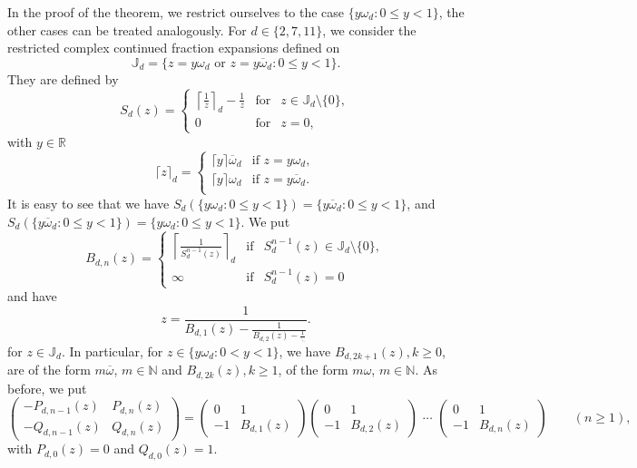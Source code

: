 \documentclass[graybox]{svmult}
\begin{document}
In the proof of the theorem, we restrict ourselves to the case $\{y\omega_{d} : 0 \le y <1\}$, the other cases can be treated analogously. For $d\in\{2,7,11\}$, we consider the restricted complex continued fraction expansions defined on 
\[
\mathbb J_{d} = \{ z= y \omega_{d} \text{ or } z= y \overline{\omega}_{d} : 0 \le y < 1\}.
\]
They are defined by 
\[
S_{d}(z) = \left\{ \begin{array}{lll}
\left\lceil\tfrac{1}{z}\right\rceil_{d} - \tfrac{1}{z} & \mbox{for} & z \in \mathbb J_{d} \setminus 
\{0\}, \\
0 & \mbox{for} & z=0,  \end{array} \right.    
\]
with $y\in \mathbb{R}$
\[
\lceil z \rceil_{d} =
\begin{cases}
\lceil y \rceil \overline \omega_{d} & \text{if }z = y \omega_d, \\
\lceil y \rceil  \omega_{d} & \text{if }z = y \overline \omega_d. \\ 
\end{cases}
\]
It is easy to see that we have $S_{d}(\{y \omega_{d} : 0 \le y <1\}) = \{y \overline{\omega}_{d} : 0 \le y < 1\}$, and $S_{d}(\{y \overline{\omega}_{d} : 0 \le y <1\}) = \{y \omega_{d} : 0 \le y < 1\}$.  
We put
\[
B_{d, n}(z) = \left\{\begin{array}{lll} \left\lceil \tfrac{1}{S_{d}^{n-1}(z)}\right\rceil_d
&\mbox{if} & S_{d}^{n-1}(z) \in \mathbb J_{d} \setminus \{0\}, \\
\infty         & \mbox{if} &   S_{d}^{n-1}(z) = 0 \end{array} \right.    
\]
and have 
\[
z=\displaystyle \frac1{B_{d, 1}(z)- 
 \displaystyle  \frac1{B_{d, 2}(z) - 
 \displaystyle \frac1{\ddots}}}.
\]
for $ z \in \mathbb J_{d}$.  In particular, for $z \in \{y\omega_d  : 0 < y < 1\}$, we have 
$B_{d, 2k+1}(z), k \ge 0$, are of the form $m \overline{\omega}$, $m \in \mathbb N$ and 
$B_{d, 2k}(z), k \ge 1$, of the form $m \omega$, $m \in \mathbb N$.  As before, we put 
\[
\begin{pmatrix} -P_{d, n-1}(z) & P_{d, n}(z) \\  -Q_{d, n-1}(z) &Q_{d, n}(z) 
\end{pmatrix} 
=
\begin{pmatrix} 0 & 1 \\ -1 & B_{d, 1}(z) \end{pmatrix} 
\begin{pmatrix} 0 & 1 \\ -1 & B_{d, 2}(z) \end{pmatrix}  \,\,\cdots \,\, 
\begin{pmatrix} 0 & 1 \\ -1 & B_{d, n}(z) \end{pmatrix} \qquad (n\ge1), 
\] 
with $P_{d, 0}(z) = 0$ and $Q_{d, 0}(z) = 1$. 
\end{document}
